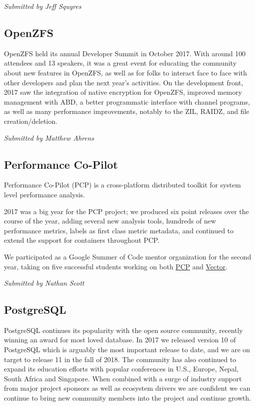 \documentclass[a4paper]{report}
\begin{document}
{\em Submitted by Jeff Squyres}

\subsection{OpenZFS}

OpenZFS held its annual Developer Summit in October 2017.  With around
100 attendees and 13 speakers, it was a great event for educating the
community about new features in OpenZFS, as well as for folks to
interact face to face with other developers and plan the next year's
activities.  On the development front, 2017 saw the integration of
native encryption for OpenZFS, improved memory management with ABD, a
better programmatic interface with channel programs, as well as many
performance improvements, notably to the ZIL, RAIDZ, and file
creation/deletion.

{\em Submitted by Matthew Ahrens}

\subsection{Performance Co-Pilot}

Performance Co-Pilot (PCP) is a cross-platform distributed toolkit for
system level performance analysis.

2017 was a big year for the PCP project; we produced six point
releases over the course of the year, adding several new analysis tools,
hundreds of new performance metrics, labels as first class metric
metadata, and continued to extend the support for containers throughout
PCP.

We participated as a Google Summer of Code mentor organization for the
second year, taking on five successful students working on both
\href{http://pcp.io/}{PCP} and \href{http://getvector.io}{Vector}.

{\em Submitted by Nathan Scott}

\subsection{PostgreSQL}

PostgreSQL continues its popularity with the open source community,
recently winning an award for most loved database. In 2017 we released
version 10 of PostgreSQL which is arguably the most important release to
date, and we are on target to release 11 in the fall of 2018.  The
community has also continued to expand its education efforts with
popular conferences in U.S., Europe, Nepal, South Africa and Singapore.
When combined with a surge of industry support from major project
sponsors as well as ecosystem drivers we are confident we can continue
to bring new community members into the project and continue growth.
\end{document}
